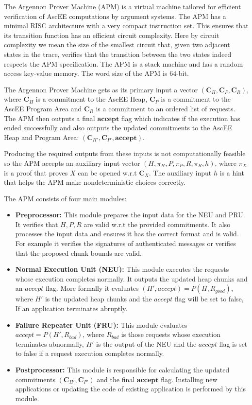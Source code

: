 
The Argennon Prover Machine (APM) is a virtual machine tailored for efficient verification of AscEE computations by
argument systems. The APM has a minimal RISC architecture with a very compact instruction set. This ensures that
its transition function has an efficient circuit complexity. Here by circuit complexity we mean the size
of the smallest circuit that, given two adjacent states in the trace, verifies that the transition between the two
states indeed respects the APM specification. The APM is a stack machine and has a random access key-value memory.
The word size of the APM is 64-bit.

The Argennon Prover Machine gets as its primary input a vector $(\mathbf{C}_H,\mathbf{C}_P,\mathbf{C}_R)$, where
$\mathbf{C}_H$ is a commitment to the AscEE Heap, $\mathbf{C}_P$ is a commitment to the AscEE Program Area and
$\mathbf{C}_R$ is a commitment to an ordered list of requests. The APM then outputs a final
$\mathbf{accept}$ flag which indicates if the execution has ended successfully and also outputs the updated
commitments to the AscEE Heap and Program Area: $(\mathbf{C}_{H'},\mathbf{C}_{P'},\mathbf{accept})$.

Producing the required outputs from these inputs is not computationally feasible so the APM accepts an auxiliary
input vector $(H,\pi_H,P,\pi_P,R,\pi_R,h)$, where $\pi_X$ is a proof that proves $X$ can be opened w.r.t
$\mathbf{C}_X$. The auxiliary input $h$ is a hint that helps the APM make nondeterministic choices correctly.

The APM consists of four main modules:
\begin{itemize}
    \item \textbf{Preprocessor:} This module prepares the input data for the NEU and PRU. It verifies that $H,
    P,R$ are valid w.r.t the provided commitments. It also processes the input data and ensures it has the
    correct format and is valid. For example it verifies the signatures of authenticated messages or
    verifies that the proposed chunk bounds are valid.
    \item \textbf{Normal Execution Unit (NEU):} This module executes the requests whose execution completes
    normally. It outputs the updated heap chunks and an $accept$ flag. More formally it evaluates $(H',accept)=P(H,
    R_{good})$, where $H'$ is the updated heap chunks and the $accept$ flag will be set to false, If an
    application terminates abruptly.
    \item \textbf{Failure Repeater Unit (FRU):} This module evaluates $accept=P(H',R_{bad})$, where $R_{bad}$ is
    those requests whose execution terminates abnormally, $H'$ is the output of the NEU and the $accept$ flag is set
    to false if a request execution completes normally.
    \item \textbf{Postprocessor:} This module is responsible for calculating the updated commitments
    $(\mathbf{C}_{H'}, \mathbf{C}_{P'})$ and the final $\mathbf{accept}$ flag. Installing new applications or
    updating the code of existing application is performed by this module.
\end{itemize}

